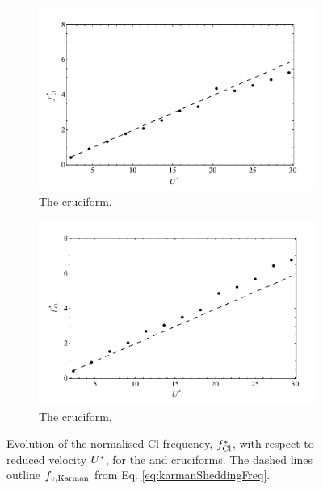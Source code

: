 \documentclass[oneside]{utmthesis}
\begin{document}
\begin{figure}
  \centering
  \begin{subfigure}[h]{1\textwidth}
    \includegraphics[width=\textwidth]{figs/clFreq4}
    \caption{The \angfo{} cruciform.}
    \label{fig:clFreq4}
  \end{subfigure}
 
  \begin{subfigure}[h]{1\textwidth}
    \includegraphics[width=\textwidth]{figs/clFreq3}
    \caption{The \angth{} cruciform.}
    \label{fig:clFreq3}
  \end{subfigure}

  \label{fig:clFreq43}
  \caption{Evolution of the normalised Cl frequency, $f_{\text{Cl}}^{*}$, with respect to reduced velocity $U^{*}$, for the \angfo{} and \angth{} cruciforms. The dashed lines outline $f_{v,\text{Karman}}$ from Eq. \ref{eq:karmanSheddingFreq}.}
\end{figure}
\end{document}

